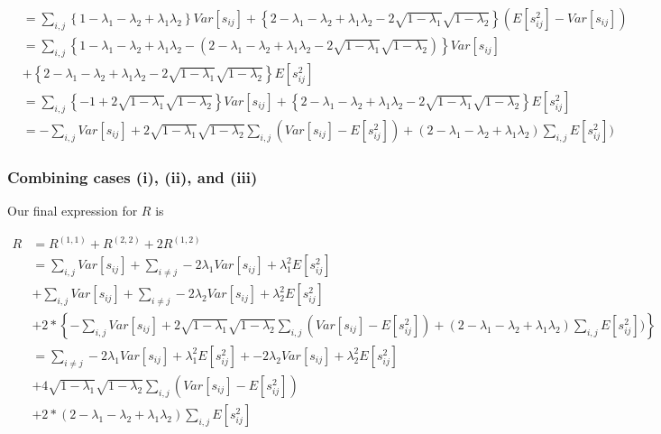 \documentclass[
]{article}
\begin{document}
\[
\begin{aligned}
&= \sum_{i,j} \left\{1-\lambda_1-\lambda_2+\lambda_1\lambda_2\right\}Var[s_{ij}] + \left\{2 -\lambda_1 -\lambda_2 + \lambda_1\lambda_2 - 2\sqrt{1-\lambda_1}\sqrt{1-\lambda_2}\right\}(E[s_{ij}^2]-Var[s_{ij}]) \\
& = \sum_{i,j}\left\{1-\lambda_1-\lambda_2+\lambda_1\lambda_2  - (2 - \lambda_1 - \lambda_2 + \lambda_1\lambda_2 - 2\sqrt{1-\lambda_1}\sqrt{1-\lambda_2})\right\}Var[s_{ij}] \\
& + \left\{2 - \lambda_1 - \lambda_2 + \lambda_1\lambda_2 - 2\sqrt{1-\lambda_1}\sqrt{1-\lambda_2}\right\}E[s_{ij}^2] \\
& = \sum_{i,j}\left\{-1 + 2\sqrt{1-\lambda_1}\sqrt{1-\lambda_2}\right\}Var[s_{ij}] + \left\{2 - \lambda_1 - \lambda_2 + \lambda_1\lambda_2 - 2\sqrt{1-\lambda_1}\sqrt{1-\lambda_2}\right\}E[s_{ij}^2] \\
&= -\sum_{i,j}Var[s_{ij}] + 2\sqrt{1-\lambda_1}\sqrt{1-\lambda_2}\sum_{i,j}(Var[s_{ij}] - E[s_{ij}^2]) + (2-\lambda_1 - \lambda_2 + \lambda_1\lambda_2)\sum_{i,j}E[s_{ij}^2])
\end{aligned}
\]

\hypertarget{combining-cases-i-ii-and-iii}{%
\subsubsection{Combining cases (i), (ii), and
(iii)}\label{combining-cases-i-ii-and-iii}}

Our final expression for \(R\) is

\[
\begin{aligned}
R &= R^{(1,1)} + R^{(2,2)} + 2R^{(1,2)} \\
&= \sum_{i,j}Var[s_{ij}] + \sum_{i \neq j}-2\lambda_1Var[s_{ij}] + \lambda_1^2E[s_{ij}^2] \\
& + \sum_{i,j}Var[s_{ij}] + \sum_{i \neq j}-2\lambda_2Var[s_{ij}] + \lambda_2^2E[s_{ij}^2]  \\
& + 2*\left\{-\sum_{i,j}Var[s_{ij}] + 2\sqrt{1-\lambda_1}\sqrt{1-\lambda_2}\sum_{i,j}(Var[s_{ij}] - E[s_{ij}^2]) + (2-\lambda_1 - \lambda_2 + \lambda_1\lambda_2)\sum_{i,j}E[s_{ij}^2])\right\} \\
&= \sum_{i \neq j}-2\lambda_1Var[s_{ij}] + \lambda_1^2E[s_{ij}^2]  + -2\lambda_2Var[s_{ij}] + \lambda_2^2E[s_{ij}^2] \\
& +4\sqrt{1-\lambda_1}\sqrt{1-\lambda_2} \sum_{i,j}(Var[s_{ij}] - E[s_{ij}^2])  \\
& + 2*(2-\lambda_1 - \lambda_2 + \lambda_1\lambda_2)\sum_{i,j}E[s_{ij}^2] \\
\end{aligned}
\]
\end{document}
